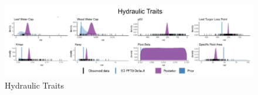 \begin{figure}[!h]
    \centering
    \includegraphics[width=.95\textwidth]{Hydro_Paper_LaTeX/Hydro_Paper_Figures/hydraulic_traits.png}
    \caption[Hydraulic Traits]{Hydraulic Traits}
    \label{fig:hydraulic_traits}
\end{figure}